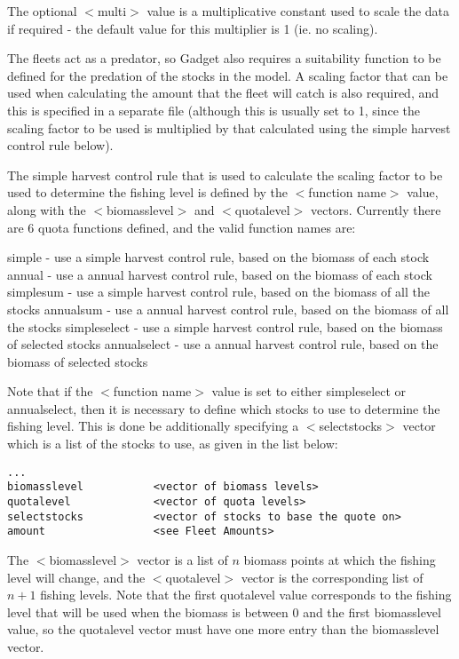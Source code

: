 \documentclass[]{book}
\begin{document}
The optional \(<\)multi\(>\) value is a multiplicative constant used to
scale the data if required - the default value for this multiplier is 1
(ie. no scaling).

The fleets act as a predator, so Gadget also requires a suitability
function to be defined for the predation of the stocks in the model. A
scaling factor that can be used when calculating the amount that the
fleet will catch is also required, and this is specified in a separate
file (although this is usually set to 1, since the scaling factor to be
used is multiplied by that calculated using the simple harvest control
rule below).

The simple harvest control rule that is used to calculate the scaling
factor to be used to determine the fishing level is defined by the
\(<\)function name\(>\) value, along with the \(<\)biomasslevel\(>\) and
\(<\)quotalevel\(>\) vectors. Currently there are 6 quota functions defined,
and the valid function names are:

simple - use a simple harvest control rule, based on the biomass of each
stock annual - use a annual harvest control rule, based on the biomass
of each stock simplesum - use a simple harvest control rule, based on
the biomass of all the stocks annualsum - use a annual harvest control
rule, based on the biomass of all the stocks simpleselect - use a simple
harvest control rule, based on the biomass of selected stocks
annualselect - use a annual harvest control rule, based on the biomass
of selected stocks

Note that if the \(<\)function name\(>\) value is set to either simpleselect
or annualselect, then it is necessary to define which stocks to use to
determine the fishing level. This is done be additionally specifying a
\(<\)selectstocks\(>\) vector which is a list of the stocks to use, as given
in the list below:

\begin{verbatim}
...
biomasslevel           <vector of biomass levels>
quotalevel             <vector of quota levels>
selectstocks           <vector of stocks to base the quote on>
amount                 <see Fleet Amounts>
\end{verbatim}

The \(<\)biomasslevel\(>\) vector is a list of \(n\) biomass points at which
the fishing level will change, and the \(<\)quotalevel\(>\) vector is the
corresponding list of \(n+1\) fishing levels. Note that the first
quotalevel value corresponds to the fishing level that will be used when
the biomass is between 0 and the first biomasslevel value, so the
quotalevel vector must have one more entry than the biomasslevel vector.
\end{document}
